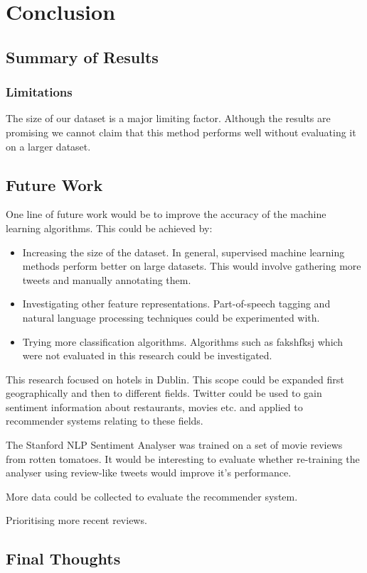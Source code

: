 \chapter{Conclusion}

\section{Summary of Results}

\subsection*{Limitations}

The size of our dataset is a major limiting factor. Although the results are promising we cannot claim that this method performs well without evaluating it on a larger dataset.

\section{Future Work}
One line of future work would be to improve the accuracy of the machine learning algorithms. This could be achieved by:
\begin{itemize}
    \item Increasing the size of the dataset. In general, supervised machine learning methods perform better on large datasets. This would involve gathering more tweets and manually annotating them.
    \item Investigating other feature representations. Part-of-speech tagging and natural language processing techniques could be experimented with.
    \item Trying more classification algorithms. Algorithms such as fakshfksj which were not evaluated in this research could be investigated. 
\end{itemize}

This research focused on hotels in Dublin. This scope could be expanded first geographically and then to different fields. Twitter could be used to gain sentiment information about restaurants, movies etc. and applied to recommender systems relating to these fields.

The Stanford NLP Sentiment Analyser was trained on a set of movie reviews from rotten tomatoes. It would be interesting to evaluate whether re-training the analyser using review-like tweets would improve it's performance. 

More data could be collected to evaluate the recommender system.

Prioritising more recent reviews.

\section{Final Thoughts}